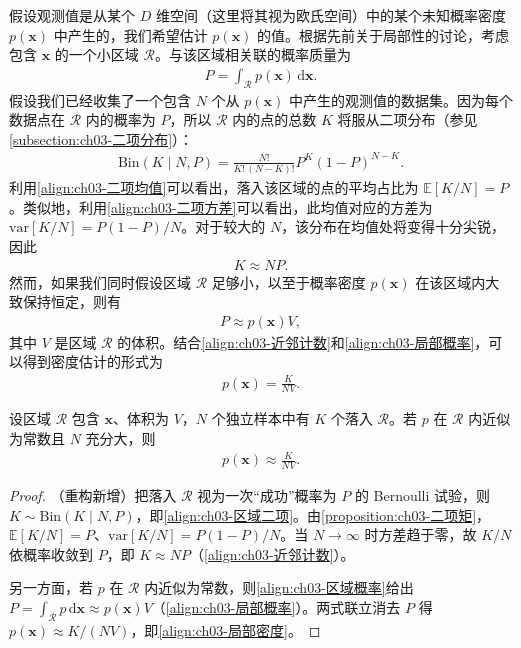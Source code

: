 \documentclass[../../main.tex]{subfiles}
\begin{document}
假设观测值是从某个 $D$ 维空间（这里将其视为欧氏空间）中的某个未知概率密度 $p(\boldsymbol{x})$ 中产生的，我们希望估计 $p(\boldsymbol{x})$ 的值。根据先前关于局部性的讨论，考虑包含 $\boldsymbol{x}$ 的一个小区域 $\mathcal{R}$。与该区域相关联的概率质量为
\begin{align}
P=\int_{\mathcal{R}}p(\boldsymbol{x})\,\mathrm{d}\boldsymbol{x}.
\label{align:ch03-区域概率}
\end{align}
假设我们已经收集了一个包含 $N$ 个从 $p(\boldsymbol{x})$ 中产生的观测值的数据集。因为每个数据点在 $\mathcal{R}$ 内的概率为 $P$，所以 $\mathcal{R}$ 内的点的总数 $K$ 将服从二项分布（参见\cref{subsection:ch03-二项分布}）：
\begin{align}
\mathrm{Bin}(K\mid N,P)=\frac{N!}{K!\,(N-K)!}P^{K}(1-P)^{N-K}.
\label{align:ch03-区域二项}
\end{align}
利用\eqref{align:ch03-二项均值}可以看出，落入该区域的点的平均占比为 $\mathbb{E}[K/N]=P$。类似地，利用\eqref{align:ch03-二项方差}可以看出，此均值对应的方差为 $\mathrm{var}[K/N]=P(1-P)/N$。对于较大的 $N$，该分布在均值处将变得十分尖锐，因此
\begin{align}
K\approx NP.
\label{align:ch03-近邻计数}
\end{align}
然而，如果我们同时假设区域 $\mathcal{R}$ 足够小，以至于概率密度 $p(\boldsymbol{x})$ 在该区域内大致保持恒定，则有
\begin{align}
P\approx p(\boldsymbol{x})V,
\label{align:ch03-局部概率}
\end{align}
其中 $V$ 是区域 $\mathcal{R}$ 的体积。结合\eqref{align:ch03-近邻计数}和\eqref{align:ch03-局部概率}，可以得到密度估计的形式为
\begin{align}
p(\boldsymbol{x})=\frac{K}{NV}.
\label{align:ch03-局部密度}
\end{align}

\begin{proposition}[局部密度估计]\label{proposition:ch03-局部密度}
设区域 $\mathcal{R}$ 包含 $\boldsymbol{x}$、体积为 $V$，$N$ 个独立样本中有 $K$ 个落入 $\mathcal{R}$。若 $p$ 在 $\mathcal{R}$ 内近似为常数且 $N$ 充分大，则
\begin{align*}
p(\boldsymbol{x})\approx\frac{K}{NV}.
\end{align*}
\end{proposition}
\begin{proof}
（重构新增）把落入 $\mathcal{R}$ 视为一次“成功”概率为 $P$ 的 Bernoulli 试验，则 $K\sim\mathrm{Bin}(K\mid N,P)$，即\eqref{align:ch03-区域二项}。由\cref{proposition:ch03-二项矩}，$\mathbb{E}[K/N]=P$、$\mathrm{var}[K/N]=P(1-P)/N$。当 $N\to\infty$ 时方差趋于零，故 $K/N$ 依概率收敛到 $P$，即 $K\approx NP$（\eqref{align:ch03-近邻计数}）。

另一方面，若 $p$ 在 $\mathcal{R}$ 内近似为常数，则\eqref{align:ch03-区域概率}给出 $P=\int_{\mathcal{R}}p\,\mathrm{d}\boldsymbol{x}\approx p(\boldsymbol{x})V$（\eqref{align:ch03-局部概率}）。两式联立消去 $P$ 得 $p(\boldsymbol{x})\approx K/(NV)$，即\eqref{align:ch03-局部密度}。
\end{proof}
\end{document}
